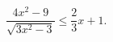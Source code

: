\begin{ex}[type=inequality]
	\begin{condition}
		$ \dfrac{4x^2 - 9}{\sqrt{3x^2 - 3}}\leqslant \dfrac{2}{3}x + 1.$
	\end{condition}
\end{ex}